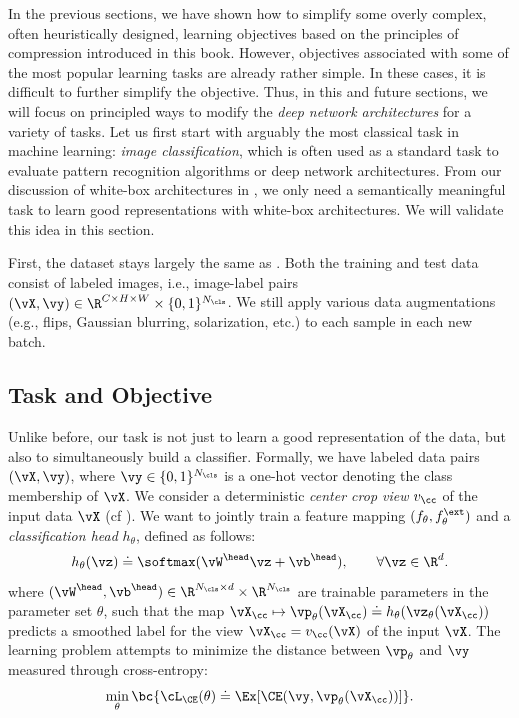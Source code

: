 \documentclass[../../book-main.tex]{subfiles}
\begin{document}
In the previous sections, we have shown how to simplify some overly
complex, often heuristically designed, learning objectives based on
the principles of compression introduced in this book. However,
objectives associated with some of the most popular learning tasks
are already rather simple. In these cases, it is difficult to further
simplify the objective. Thus, in this and future sections, we will
focus on principled ways to modify the \textit{deep network
architectures} for a variety of tasks. Let us first start with arguably the most classical task in machine
learning: \textit{image classification}, which is often used as a
standard task to evaluate pattern recognition algorithms or deep
network architectures. From our discussion of white-box architectures
in , we only need a semantically meaningful
task to learn good representations with white-box architectures. We
will validate this idea in this section.

First, the dataset stays largely the same as
. Both the training and test data
consist of labeled images, i.e., image-label pairs \((\vX, \vy) \in
\R^{C \times H \times W} \times \{0, 1\}^{N_{\cls}}\). We still apply
various data augmentations (e.g., flips, Gaussian blurring,
solarization, etc.) to each sample in each new batch.

\subsection{Task and Objective} \label{sub:image_classification_objective}

Unlike before, our task is not just to learn a good representation of
the data, but also to simultaneously build a classifier. Formally, we
have labeled data pairs \((\vX, \vy)\), where \(\vy \in \{0,
1\}^{N_{\cls}}\) is a one-hot vector denoting the class membership of
\(\vX\). We consider a deterministic \textit{center crop view}
\(v_{\cc}\) of the input data \(\vX\) (cf
). We want to jointly train
a feature mapping \((f_{\theta}, f_{\theta}^{\ext})\) and a
\textit{classification head} \(h_{\theta}\), defined as follows:
\begin{equation}
h_{\theta}(\vz) \doteq \softmax(\vW^{\head}\vz + \vb^{\head}), \qquad
\forall \vz \in \R^{d} .
\end{equation}
where \((\vW^{\head}, \vb^{\head}) \in \R^{N_{\cls} \times d} \times
\R^{N_{\cls}}\) are trainable parameters in the parameter set
\(\theta\), such that the map \(\vX_{\cc} \mapsto
\vp_{\theta}(\vX_{\cc}) \doteq h_{\theta}(\vz_{\theta}(\vX_{\cc}))\)
predicts a smoothed label for the view \(\vX_{\cc} = v_{\cc}(\vX)\)
of the input \(\vX\). The learning problem attempts to minimize the
distance between \(\vp_{\theta}\) and \(\vy\) measured through cross-entropy:
\begin{equation}\label{eq:classification_ce_loss}
\min_{\theta}\bc{\cL_{\CE}(\theta) \doteq \Ex[\CE(\vy,
\vp_{\theta}(\vX_{\cc}))]} .
\end{equation}
\end{document}
